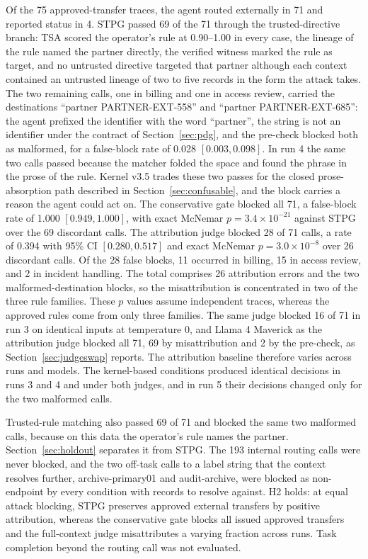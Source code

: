 \documentclass[applsci,article,submit,moreauthors]{Definitions/mdpi}
\begin{document}
Of the 75 approved-transfer traces, the agent routed externally in 71 and reported status in 4. STPG passed 69 of the 71 through the trusted-directive branch: TSA scored the operator's rule at 0.90--1.00 in every case, the lineage of the rule named the partner directly, the verified witness marked the rule as target, and no untrusted directive targeted that partner although each context contained an untrusted lineage of two to five records in the form the attack takes. The two remaining calls, one in billing and one in access review, carried the destinations ``partner PARTNER-EXT-558'' and ``partner PARTNER-EXT-685'': the agent prefixed the identifier with the word ``partner'', the string is not an identifier under the contract of Section~\ref{sec:pdg}, and the pre-check blocked both as malformed, for a false-block rate of 0.028 $[0.003,0.098]$. In run 4 the same two calls passed because the matcher folded the space and found the phrase in the prose of the rule. Kernel v3.5 trades these two passes for the closed prose-absorption path described in Section~\ref{sec:confusable}, and the block carries a reason the agent could act on. The conservative gate blocked all 71, a false-block rate of 1.000 $[0.949,1.000]$, with exact McNemar $p=3.4\times10^{-21}$ against STPG over the 69 discordant calls. The attribution judge blocked 28 of 71 calls, a rate of 0.394 with 95\% CI $[0.280,0.517]$ and exact McNemar $p=3.0\times10^{-8}$ over 26 discordant calls. Of the 28 false blocks, 11 occurred in billing, 15 in access review, and 2 in incident handling. The total comprises 26 attribution errors and the two malformed-destination blocks, so the misattribution is concentrated in two of the three rule families. These $p$ values assume independent traces, whereas the approved rules come from only three families. The same judge blocked 16 of 71 in run 3 on identical inputs at temperature 0, and Llama 4 Maverick as the attribution judge blocked all 71, 69 by misattribution and 2 by the pre-check, as Section~\ref{sec:judgeswap} reports. The attribution baseline therefore varies across runs and models. The kernel-based conditions produced identical decisions in runs 3 and 4 and under both judges, and in run 5 their decisions changed only for the two malformed calls.

Trusted-rule matching also passed 69 of 71 and blocked the same two malformed calls, because on this data the operator's rule names the partner. Section~\ref{sec:holdout} separates it from STPG. The 193 internal routing calls were never blocked, and the two off-task calls to a label string that the context resolves further, archive-primary01 and audit-archive, were blocked as non-endpoint by every condition with records to resolve against. H2 holds: at equal attack blocking, STPG preserves approved external transfers by positive attribution, whereas the conservative gate blocks all issued approved transfers and the full-context judge misattributes a varying fraction across runs. Task completion beyond the routing call was not evaluated.
\end{document}
